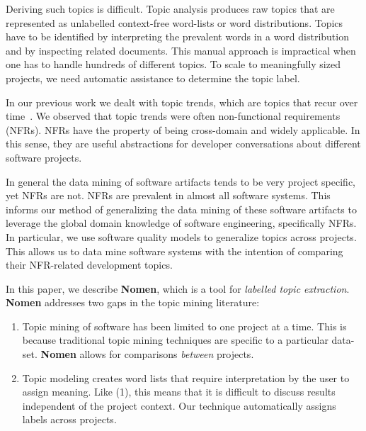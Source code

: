 \documentclass[]{sig-alternate}
\begin{document}
Deriving such topics is difficult. 
Topic analysis produces raw topics that are represented as unlabelled context-free word-lists or word distributions.
Topics have to be identified by interpreting the prevalent words in a word distribution and by inspecting related documents. 
This manual approach is impractical when one has to handle hundreds of different topics. To scale to meaningfully sized projects, we need automatic assistance to determine the topic label.


In our previous work we dealt with topic trends, which are topics that recur over time~\cite{Hindle09ICSM}. 
We observed that topic trends were often non-functional requirements (NFRs). 
NFRs have the property of being cross-domain and widely applicable. 
In this sense, they are useful abstractions for developer conversations about different software projects.

In general the data mining of software artifacts tends to be very project specific, yet NFRs are not. 
NFRs are prevalent in almost all software systems.
This informs our method of generalizing the data mining of these software artifacts to leverage the global domain knowledge of software engineering, specifically NFRs. In particular, we use software quality models to generalize topics across projects. 
This allows us to data mine software systems with the intention of comparing their NFR-related development topics.

In this paper, we describe \textbf{Nomen}, which is a tool for \emph{labelled topic extraction}. \textbf{Nomen} addresses two gaps in the topic mining literature:
\begin{enumerate}
  \item Topic mining of software has been limited to one project at a time. This is because traditional topic mining techniques are specific to a particular data-set. \textbf{Nomen} allows for comparisons \textit{between} projects. 
  \item Topic modeling creates word lists that require interpretation by the user to assign meaning. Like (1), this means
that it is difficult to discuss results independent of the project context. Our technique automatically assigns labels across projects.
\end{enumerate}
\end{document}
